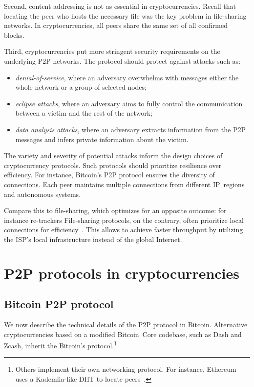 Second, content addressing is not as essential in cryptocurrencies.
Recall that locating the peer who hosts the necessary file was the key problem in file-sharing networks.
In cryptocurrencies, all peers share the same set of all confirmed blocks.

Third, cryptocurrencies put more stringent security requirements on the underlying P2P networks.
The protocol should protect against attacks such as:%

\begin{itemize}
	\item \textit{denial-of-service}, where an adversary overwhelms with messages either the whole network or a group of selected nodes;
	\item \textit{eclipse attacks}, where an adversary aims to fully control the communication between a victim and the rest of the network;
	\item \textit{data analysis attacks}, where an adversary extracts information from the P2P messages and infers private information about the victim.
\end{itemize}

The variety and severity of potential attacks inform the design choices of cryptocurrency protocols.
Such protocols should prioritize resilience over efficiency.
For instance, Bitcoin's P2P protocol ensures the diversity of connections.
Each peer maintains multiple connections from different IP~regions and autonomous systems.

Compare this to file-sharing, which optimizes for an opposite outcome: for instance re-trackers 
File-sharing protocols, on the contrary, often prioritize local connections for efficiency~\cite{Yoshida2012,Wang2012}.
This allows to achieve faster throughput by utilizing the ISP's local infrastructure instead of the global Internet.



\section{P2P protocols in cryptocurrencies}

\subsection{Bitcoin P2P protocol}
\label{sec:BitcoinP2PProtocol}

We now describe the technical details of the P2P protocol in Bitcoin.
Alternative cryptocurrencies based on a modified Bitcoin~Core codebase, such as Dash and Zcash, inherit the Bitcoin's protocol.\footnote{Others implement their own networking protocol. For instance, Ethereum uses a Kademlia-like DHT to locate peers~\cite{Henningsen2019}.}

